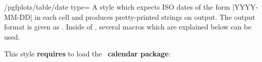 \begin{stylekey}{/pgfplots/table/date type=}%
	A style which expects ISO dates of the form |YYYY-MM-DD| in each cell and produces pretty-printed strings on output. The output format is given as . Inside of , several macros which are explained below can be used.
\begin{codeexample}[]

%

\hspace{1cm}
\end{codeexample}
	This style \textbf{requires} to load the \PGF\  \textbf{calendar package}:
\begin{codeexample}
\usepackage{pgfcalendar}
\end{codeexample}
\end{stylekey}

